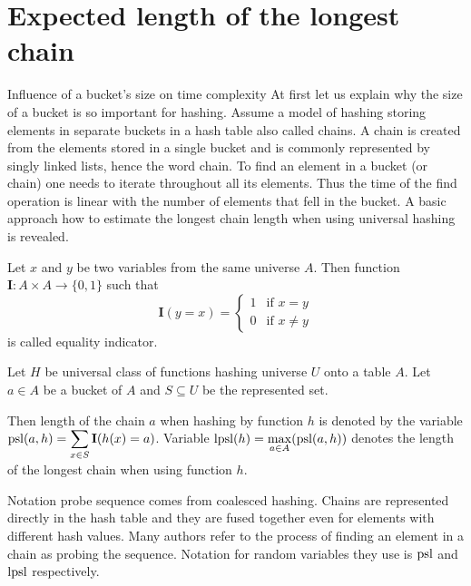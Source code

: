 \chapter{Expected length of the longest chain}

\begin{section}{Influence of a bucket's size on time complexity}
At first let us explain why the size of a bucket is so important for hashing. Assume a model of hashing storing elements in separate buckets in a hash table also called chains. A chain is created from the elements stored in a single bucket and is commonly represented by singly linked lists, hence the word chain. To find an element in a bucket (or chain) one needs to iterate throughout all its elements. Thus the time of the find operation is linear with the number of elements that fell in the bucket. A basic approach how to estimate the longest chain length when using universal hashing is revealed.

\begin{definition}
Let $x$ and $y$ be two variables from the same universe $A$. Then function $\mathbf{I}: A \times A \rightarrow \{0, 1\}$ such that
\[
 \mathbf{I}(y = x) =
  \begin{cases}
   1 & \text{if } x = y \\
   0 & \text{if } x \neq y
  \end{cases}
\]
is called equality indicator.
\end{definition}

\begin{definition}
Let $H$ be universal class of functions hashing universe $U$ onto a table $A$. Let $a \in A$ be a bucket of $A$ and $S \subseteq U$ be the represented set. 

Then length of the chain $a$ when hashing by function $h$ is denoted by the variable $\mathrm{psl}(a, h) = \displaystyle \sum_{x \in S} \mathbf{I}(h(x) = a)$. Variable $\mathrm{lpsl}(h) = \displaystyle \max_{a \in A} (\mathrm{psl}(a, h))$ denotes the length of the longest chain when using function $h$.
\end{definition}

Notation probe sequence comes from coalesced hashing. Chains are represented directly in the hash table and they are fused together even for elements with different hash values. Many authors refer to the process of finding an element in a chain as probing the sequence. Notation for random variables they use is $\mathrm{psl}$ and $\mathrm{lpsl}$ respectively. %


\end{section}
